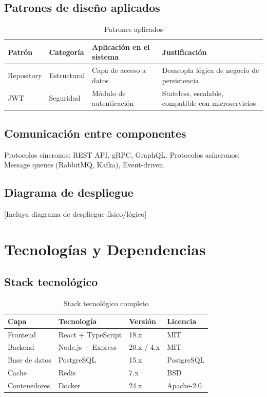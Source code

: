 \documentclass[a4paper,11pt,spanish]{article}
\begin{document}
\subsection{Patrones de diseño aplicados}

\begin{table}[H]
\centering
\caption{Patrones aplicados}
\label{tab:patrones}
\begin{tabular}{@{}llll@{}}
\toprule
\textbf{Patrón} & \textbf{Categoría} & \textbf{Aplicación en el sistema} & \textbf{Justificación} \\
\midrule
Repository & Estructural & Capa de acceso a datos & Desacopla lógica de negocio de persistencia \\
JWT & Seguridad & Módulo de autenticación & Stateless, escalable, compatible con microservicios \\
\bottomrule
\end{tabular}
\end{table}

\subsection{Comunicación entre componentes}

Protocolos síncronos: REST API, gRPC, GraphQL. Protocolos asíncronos: Message queues (RabbitMQ, Kafka), Event-driven.

\vspace{1em}

\subsection{Diagrama de despliegue}

[Incluya diagrama de despliegue físico/lógico]

\newpage

\section{Tecnologías y Dependencias}

\subsection{Stack tecnológico}

\begin{table}[H]
\centering
\caption{Stack tecnológico completo}
\label{tab:stack}
\begin{tabular}{@{}llll@{}}
\toprule
\textbf{Capa} & \textbf{Tecnología} & \textbf{Versión} & \textbf{Licencia} \\
\midrule
Frontend & React + TypeScript & 18.x & MIT \\
Backend & Node.js + Express & 20.x / 4.x & MIT \\
Base de datos & PostgreSQL & 15.x & PostgreSQL \\
Cache & Redis & 7.x & BSD \\
Contenedores & Docker & 24.x & Apache-2.0 \\
\bottomrule
\end{tabular}
\end{table}
\end{document}
